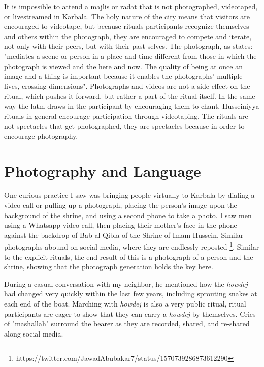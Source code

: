 It is impossible to attend a majlis or radat that is not photographed, videotaped, or livestreamed in Karbala. The holy nature of the city means that visitors are encouraged to videotape, but because rituals participants recognize themselves and others within the photograph, they are encouraged to compete and iterate, not only with their peers, but with their past selves. The photograph, as \cite[92]{johnson_automatic_2020} states: "mediates a scene or person in a place and time different from those in which the photograph is viewed and the here and now. The quality of being at once an image and a thing is important because it enables the photographs’ multiple lives, crossing dimensions". Photographs and videos are not a side-effect on the ritual, which pushes it forward, but rather a part of the ritual itself. In the same way the latm draws in the participant by encouraging them to chant, Husseiniyya rituals in general encourage participation through videotaping. The rituals are not spectacles that get photographed, they are spectacles because in order to encourage photography. 

\section{Photography and Language}
One curious practice I saw was bringing people virtually to Karbala by dialing a video call or pulling up a photograph, placing the person’s image upon the background of the shrine, and using a second phone to take a photo. I saw men using a Whatsapp video call, then placing their mother’s face in the phone against the backdrop of Bab al-Qibla of the Shrine of Imam Hussein. Similar photographs abound on social media, where they are endlessly reposted \footnote{https://twitter.com/JawadAbubakar7/status/1570739286873612290}. Similar to the explicit rituals, the end result of this is a photograph of a person and the shrine, showing that the photograph generation holds the key here. 

During a casual conversation with my neighbor, he mentioned how the \emph{howdej} had changed very quickly within the last few years, including sprouting snakes at each end of the boat. Marching with \emph{howdej} is also a very public ritual, ritual participants are eager to show that they can carry a \emph{howdej} by themselves. Cries of "mashallah" surround the bearer as they are recorded, shared, and re-shared along social media. 


